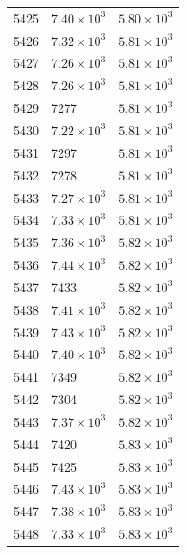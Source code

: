 \begin{table}[H]
\begin{tabular}{lll}
5425 & $\displaystyle 7.40 \times 10^{3}$ & $\displaystyle 5.80 \times 10^{3}$ \\
5426 & $\displaystyle 7.32 \times 10^{3}$ & $\displaystyle 5.81 \times 10^{3}$ \\
5427 & $\displaystyle 7.26 \times 10^{3}$ & $\displaystyle 5.81 \times 10^{3}$ \\
5428 & $\displaystyle 7.26 \times 10^{3}$ & $\displaystyle 5.81 \times 10^{3}$ \\
5429 & 7277 & $\displaystyle 5.81 \times 10^{3}$ \\
5430 & $\displaystyle 7.22 \times 10^{3}$ & $\displaystyle 5.81 \times 10^{3}$ \\
5431 & 7297 & $\displaystyle 5.81 \times 10^{3}$ \\
5432 & 7278 & $\displaystyle 5.81 \times 10^{3}$ \\
5433 & $\displaystyle 7.27 \times 10^{3}$ & $\displaystyle 5.81 \times 10^{3}$ \\
5434 & $\displaystyle 7.33 \times 10^{3}$ & $\displaystyle 5.81 \times 10^{3}$ \\
5435 & $\displaystyle 7.36 \times 10^{3}$ & $\displaystyle 5.82 \times 10^{3}$ \\
5436 & $\displaystyle 7.44 \times 10^{3}$ & $\displaystyle 5.82 \times 10^{3}$ \\
5437 & 7433 & $\displaystyle 5.82 \times 10^{3}$ \\
5438 & $\displaystyle 7.41 \times 10^{3}$ & $\displaystyle 5.82 \times 10^{3}$ \\
5439 & $\displaystyle 7.43 \times 10^{3}$ & $\displaystyle 5.82 \times 10^{3}$ \\
5440 & $\displaystyle 7.40 \times 10^{3}$ & $\displaystyle 5.82 \times 10^{3}$ \\
5441 & 7349 & $\displaystyle 5.82 \times 10^{3}$ \\
5442 & 7304 & $\displaystyle 5.82 \times 10^{3}$ \\
5443 & $\displaystyle 7.37 \times 10^{3}$ & $\displaystyle 5.82 \times 10^{3}$ \\
5444 & 7420 & $\displaystyle 5.83 \times 10^{3}$ \\
5445 & 7425 & $\displaystyle 5.83 \times 10^{3}$ \\
5446 & $\displaystyle 7.43 \times 10^{3}$ & $\displaystyle 5.83 \times 10^{3}$ \\
5447 & $\displaystyle 7.38 \times 10^{3}$ & $\displaystyle 5.83 \times 10^{3}$ \\
5448 & $\displaystyle 7.33 \times 10^{3}$ & $\displaystyle 5.83 \times 10^{3}$ \\

\end{tabular}
\end{table}
